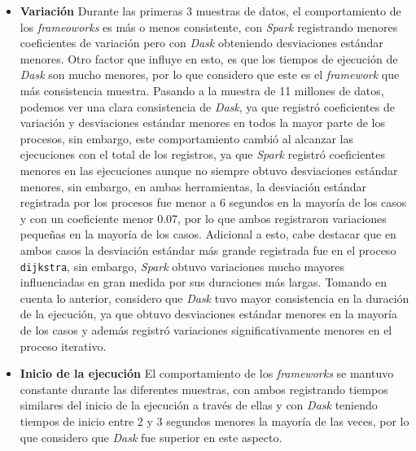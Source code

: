 \begin{itemize}
	\item \textbf{Variación} Durante las primeras 3 muestras de datos, el comportamiento de los \textit{frameoworks} es más o menos consistente, con \textit{Spark} registrando menores coeficientes de variación pero con \textit{Dask} obteniendo desviaciones estándar menores. Otro factor que influye en esto, es que los tiempos de ejecución de \textit{Dask} son mucho menores, por lo que considero que este es el \textit{framework} que más consistencia muestra. Pasando a la muestra de 11 millones de datos, podemos ver una clara consistencia de \textit{Dask}, ya que registró coeficientes de variación y desviaciones estándar menores en todos la mayor parte de los procesos, sin embargo, este comportamiento cambió al alcanzar las ejecuciones con el total de los registros, ya que \textit{Spark} registró coeficientes menores en las ejecuciones aunque no siempre obtuvo desviaciones estándar menores, sin embargo, en ambas herramientas, la desviación estándar registrada por los procesos fue menor a 6 segundos en la mayoría de los casos y con un coeficiente menor 0.07, por lo que ambos registraron variaciones pequeñas en la mayoría de los casos. Adicional a esto, cabe destacar que en ambos casos la desviación estándar más grande registrada fue en el proceso \texttt{dijkstra}, sin embargo, \textit{Spark} obtuvo variaciones mucho mayores influenciadas en gran medida por sus duraciones más largas. Tomando en cuenta lo anterior, considero que \textit{Dask} tuvo mayor consistencia en la duración de la ejecución, ya que obtuvo desviaciones estándar menores en la mayoría de los casos y además registró variaciones significativamente menores en el proceso iterativo.
	
	\item \textbf{Inicio de la ejecución} El comportamiento de los \textit{frameworks} se mantuvo constante durante las diferentes muestras, con ambos registrando tiempos similares del inicio de la ejecución a través de ellas y con \textit{Dask} teniendo tiempos de inicio entre 2 y 3 segundos menores la mayoría de las veces, por lo que considero que \textit{Dask} fue superior en este aspecto.
	

\end{itemize}
